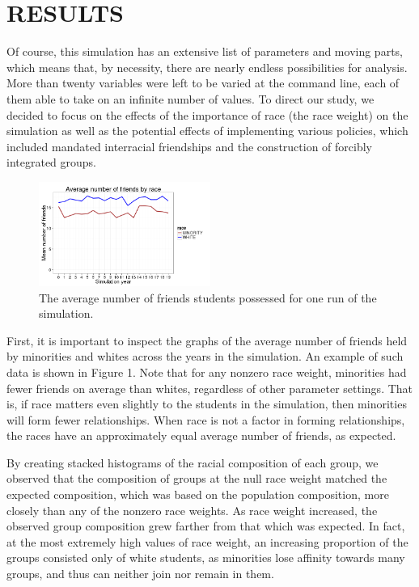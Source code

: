 
\section{RESULTS}
\label{sec:results}

Of course, this simulation has an extensive list of parameters and moving parts, which means that, by necessity, 
there are nearly endless possibilities for analysis. More than twenty variables were left to be varied at the command line, 
each of them able to take on an infinite number of values. To direct our study, we decided to focus on the effects of the 
importance of race (the race weight) on the simulation as well as the potential effects of implementing various policies, 
which included mandated interracial friendships and the construction of forcibly integrated groups.

\begin{figure}[h]\label{AvgFriends}
  \centering
    \includegraphics[width=0.5\textwidth]{avgNumberOfFriendsFromCaladan.png}
      \caption{The average number of friends students possessed for one run of the simulation.}
\end{figure}
First, it is important to inspect the graphs of the average number of friends held by minorities and whites across the years 
in the simulation. An example of such data is shown in Figure 1. Note that for any nonzero race weight, 
minorities had fewer friends on average than whites, regardless of other parameter settings. That is, if race matters even 
slightly to the students in the simulation, then minorities will form fewer relationships. When race is not a factor in 
forming relationships, the races have an approximately equal average number of friends, as expected.

By creating stacked histograms of the racial composition of each group, we observed that the composition of groups at the null 
race weight matched the expected composition, which was based on the population composition, more closely than any of the 
nonzero race weights. As race weight increased, the observed group composition grew farther from that which was expected. In 
fact, at the most extremely high values of race weight, an increasing proportion of the groups consisted only of white 
students, as minorities lose affinity towards many groups, and thus can neither join nor remain in them.

